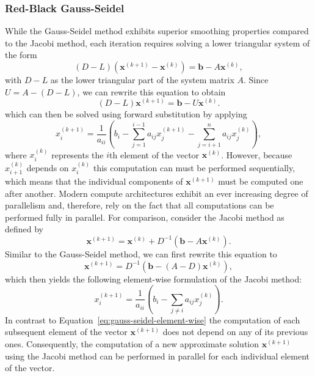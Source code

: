 \subsubsection{Red-Black Gauss-Seidel}
While the Gauss-Seidel method exhibits superior smoothing properties compared to the Jacobi method, each iteration requires solving a lower triangular system of the form
\begin{equation*}
	(D - L) (\bm{x}^{(k+1)} - \bm{x}^{(k)}) = \bm{b} - A \bm{x}^{(k)},
\end{equation*}
with $D - L$ as the lower triangular part of the system matrix $A$.
Since $U = A - (D - L)$, we can rewrite this equation to obtain
\begin{equation*}
	(D - L) \bm{x}^{(k+1)} = \bm{b} - U \bm{x}^{(k)}.
\end{equation*}  
which can then be solved using forward substitution by applying
\begin{equation}
	x_{i}^{(k+1)}={\frac {1}{a_{ii}}}\left(b_{i}-\sum _{j=1}^{i-1}a_{ij}x_{j}^{(k+1)}-\sum _{j=i+1}^{n}a_{ij}x_{j}^{(k)}\right),
	\label{eq:gauss-seidel-element-wise}
\end{equation}
where $x_{i}^{(k)}$ represents the $i$th element of the vector $\bm{x}^{(k)}$.
However, because $x_{i+1}^{(k)}$ depends on $x_{i}^{(k)}$ this computation can must be performed sequentially, which means that the individual components of $\bm{x}^{(k+1)}$ must be computed one after another. 
Modern compute architectures exhibit an ever increasing degree of parallelism and, therefore, rely on the fact that all computations can be performed fully in parallel.
For comparison, consider the Jacobi method as defined by 
\begin{equation*}
	\bm{x}^{(k+1)} = \bm{x}^{(k)} + D^{-1}(\bm b - A \bm{x}^{(k)}).
\end{equation*}
Similar to the Gauss-Seidel method, we can first rewrite this equation to
\begin{equation*}
	\bm{x}^{(k+1)} = D^{-1}(\bm b - (A - D)\bm{x}^{(k)}),
\end{equation*}
which then yields the following element-wise formulation of the Jacobi method:
\begin{equation}
x_{i}^{(k+1)}={\frac {1}{a_{ii}}}\left(b_{i}-\sum _{j\neq i}a_{ij}x_{j}^{(k)}\right).
	\label{eq:jacobi-element-wise}
\end{equation}
In contrast to Equation~\eqref{eq:gauss-seidel-element-wise} the computation of each subsequent element of the vector $\bm{x}^{(k+1)}$ does not depend on any of its previous ones.
Consequently, the computation of a new approximate solution $\bm{x}^{(k+1)}$ using the Jacobi method can be performed in parallel for each individual element of the vector.

